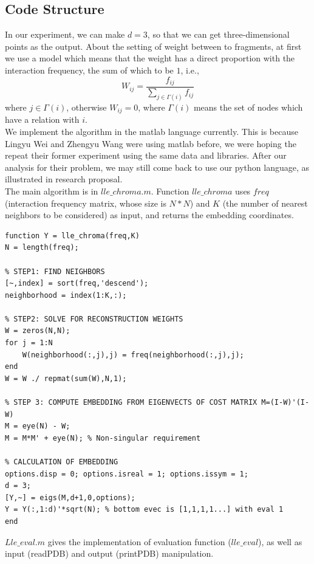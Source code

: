 \documentclass[12pt]{article} %
\begin{document}
\subsection{Code Structure} 
In our experiment, we can make $d=3$, so that we can get three-dimensional points as the output. About the setting of weight between to fragments, at first we use a model which means that the weight has a direct proportion with the interaction frequency, the sum of which to be $1$, i.e., 
		$$ W_{ij} = \frac{f_{ij}}{\sum_{j \in \Gamma(i)}f_{ij}} $$
where $j \in \Gamma(i)$, otherwise $W_{ij} = 0$, where $\Gamma(i)$ means the set of nodes which have a relation with $i$. \\
We implement the algorithm in the matlab language currently. This is because Lingyu Wei and Zhengyu Wang were using matlab before, we were hoping the repeat their former experiment using the same data and libraries. After our analysis for their problem, we may still come back to use our python language, as illustrated in research proposal. \\
The main algorithm is in $lle\_chroma.m$. Function $lle\_chroma$ uses $freq$ (interaction frequency matrix, whose size is $N*N$) and $K$ (the number of nearest neighbors to be considered) as input, and returns the embedding coordinates.
\begin{lstlisting}
function Y = lle_chroma(freq,K)
N = length(freq);

% STEP1: FIND NEIGHBORS
[~,index] = sort(freq,'descend');
neighborhood = index(1:K,:);

% STEP2: SOLVE FOR RECONSTRUCTION WEIGHTS
W = zeros(N,N);
for j = 1:N
    W(neighborhood(:,j),j) = freq(neighborhood(:,j),j);
end
W = W ./ repmat(sum(W),N,1);

% STEP 3: COMPUTE EMBEDDING FROM EIGENVECTS OF COST MATRIX M=(I-W)'(I-W)
M = eye(N) - W;
M = M*M' + eye(N); % Non-singular requirement

% CALCULATION OF EMBEDDING
options.disp = 0; options.isreal = 1; options.issym = 1;
d = 3;
[Y,~] = eigs(M,d+1,0,options);
Y = Y(:,1:d)'*sqrt(N); % bottom evec is [1,1,1,1...] with eval 1
end
\end{lstlisting}
$Lle\_eval.m$ gives the implementation of evaluation function ($lle\_eval$), as well as input (readPDB) and output (printPDB) manipulation.
\end{document}
